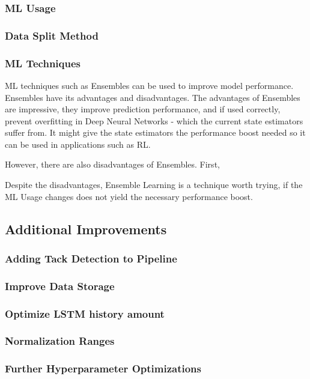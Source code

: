 \documentclass[12pt,twoside]{report}
\begin{document}
\subsubsection{ML Usage}


\subsubsection{Data Split Method}


\subsubsection{ML Techniques}
ML techniques such as Ensembles can be used to improve model performance. Ensembles have its advantages and disadvantages. The advantages of Ensembles are impressive, they improve prediction performance, and if used correctly, prevent overfitting in Deep Neural Networks \cite{ensembles-paper} - which the current state estimators suffer from. It might give the state estimators the performance boost needed so it can be used in applications such as RL. 

However, there are also disadvantages of Ensembles. First,

Despite the disadvantages, Ensemble Learning is a technique worth trying, if the ML Usage changes does not yield the necessary performance boost.



\subsection{Additional Improvements}

\subsubsection{Adding Tack Detection to Pipeline}
\subsubsection{Improve Data Storage}
\subsubsection{Optimize LSTM history amount}
\subsubsection{Normalization Ranges}
\subsubsection{Further Hyperparameter Optimizations}
\end{document}
